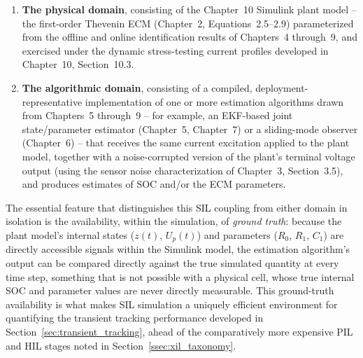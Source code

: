 \begin{enumerate}
	\item \textbf{The physical domain}, consisting of the Chapter~10 Simulink plant model -- the first-order Thevenin ECM (Chapter~2, Equations~2.5--2.9) parameterized from the offline and online identification results of Chapters~4 through~9, and exercised under the dynamic stress-testing current profiles developed in Chapter~10, Section~10.3.
	\item \textbf{The algorithmic domain}, consisting of a compiled, deployment-representative implementation of one or more estimation algorithms drawn from Chapters~5 through~9 -- for example, an EKF-based joint state/parameter estimator (Chapter~5, Chapter~7) or a sliding-mode observer (Chapter~6) -- that receives the same current excitation applied to the plant model, together with a noise-corrupted version of the plant's terminal voltage output (using the sensor noise characterization of Chapter~3, Section~3.5), and produces estimates of SOC and/or the ECM parameters.
\end{enumerate}

The essential feature that distinguishes this SIL coupling from either domain in isolation is the availability, within the simulation, of \emph{ground truth}: because the plant model's internal states ($z(t)$, $U_p(t)$) and parameters ($R_0$, $R_1$, $C_1$) are directly accessible signals within the Simulink model, the estimation algorithm's output can be compared directly against the true simulated quantity at every time step, something that is not possible with a physical cell, whose true internal SOC and parameter values are never directly measurable. This ground-truth availability is what makes SIL simulation a uniquely efficient environment for quantifying the transient tracking performance developed in Section~\ref{sec:transient_tracking}, ahead of the comparatively more expensive PIL and HIL stages noted in Section~\ref{ssec:xil_taxonomy}.

